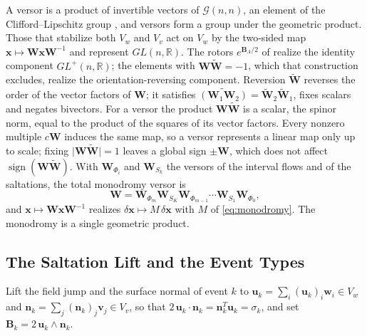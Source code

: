 \documentclass[journal]{IEEEtran}
\newcommand{\Gnn}{\mathcal{G}(n,n)}
\newcommand{\rev}[1]{\widetilde{#1}}
\newcommand{\sgn}{\operatorname{sign}}
\begin{document}
A versor is a product of invertible vectors of $\Gnn$, an element of the
Clifford--Lipschitz group \cite{lounesto2001}, and versors form a group
under the geometric product. Those that stabilize both $V_w$ and $V_v$ act
on $V_w$ by the two-sided map $\bm{x}\mapsto\bm{W}\bm{x}\bm{W}^{-1}$ and
represent $GL(n,\mathbb{R})$. The rotors $e^{\bm{B}_A/2}$ of
\cite{doran1993lie} realize the identity component $GL^{+}(n,\mathbb{R})$;
the elements with $\bm{W}\rev{\bm{W}}=-1$, which that construction excludes,
realize the orientation-reversing component. Reversion $\rev{\bm{W}}$
reverses the order of the vector factors of $\bm{W}$; it satisfies
$\rev{(\bm{W}_1\bm{W}_2)}=\rev{\bm{W}}_2\rev{\bm{W}}_1$, fixes scalars and
negates bivectors. For a versor the product $\bm{W}\rev{\bm{W}}$ is a scalar,
the spinor norm, equal to the product of the squares of its vector factors.
Every nonzero multiple $c\bm{W}$ induces the same map, so a versor
represents a linear map only up to scale; fixing
$\lvert\bm{W}\rev{\bm{W}}\rvert=1$ leaves a global sign $\pm\bm{W}$, which
does not affect $\sgn(\bm{W}\rev{\bm{W}})$. With $\bm{W}_{\Phi_i}$ and
$\bm{W}_{S_k}$ the versors of the interval flows and of the saltations, the
total monodromy versor is
\begin{equation}
\bm{W}=\bm{W}_{\Phi_m}\bm{W}_{S_K}\bm{W}_{\Phi_{m-1}}\cdots \bm{W}_{S_1}\bm{W}_{\Phi_0},
\label{eq:Wtotal}
\end{equation}
and $\bm{x}\mapsto\bm{W}\bm{x}\bm{W}^{-1}$ realizes
$\delta\bm{x}\mapsto M\,\delta\bm{x}$ with $M$ of \eqref{eq:monodromy}. The
monodromy is a single geometric product.

\subsection{The Saltation Lift and the Event Types}
Lift the field jump and the surface normal of event $k$ to
$\bm{u}_k=\sum_i (\bm{u}_k)_i \bm{w}_i\in V_w$ and
$\bm{n}_k=\sum_j (\bm{n}_k)_j \bm{v}_j\in V_v$, so that
$2\,\bm{u}_k\!\cdot\!\bm{n}_k=\bm{n}_k^{T}\bm{u}_k=\sigma_k$, and set
$\bm{B}_k=2\,\bm{u}_k\wedge \bm{n}_k$.
\end{document}
